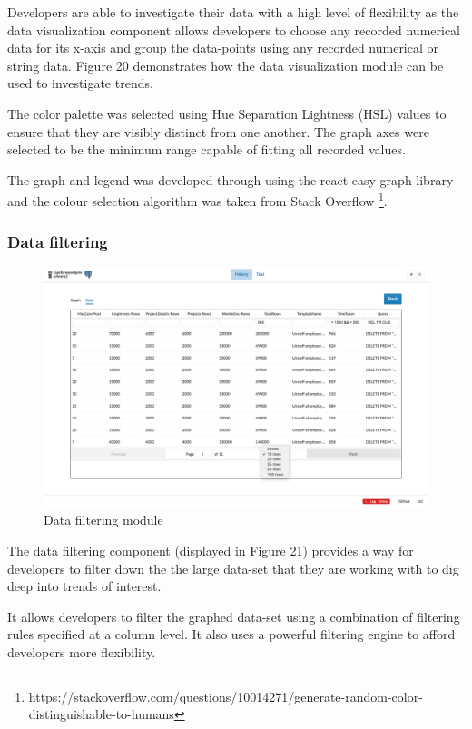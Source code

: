\documentclass[12pt]{article}
\begin{document}
\begin{spacing}{1.9}
	Developers are able to investigate their data with a high level of flexibility as the data visualization component allows developers to choose any recorded numerical data for its x-axis and group the data-points using any recorded numerical or string data. Figure 20 demonstrates how the data visualization module can be used to investigate trends.
	
	The color palette was selected using Hue Separation Lightness (HSL) values to ensure that they are visibly distinct from one another. The graph axes were selected to be the minimum range capable of fitting all recorded values.
	
	The graph and legend was developed through using the react-easy-graph library and the colour selection algorithm was taken from Stack Overflow \footnote{https://stackoverflow.com/questions/10014271/generate-random-color-distinguishable-to-humans}.
	
	\subsubsection{ Data filtering}
	
	\begin{figure}[H]
		\centering
		\includegraphics[width=\textwidth]{3-6-3.png}
		\caption{Data filtering module }
		
	\end{figure}
	
	The data filtering component (displayed in Figure 21) provides a way for developers to filter down the the large data-set that they are working with to dig deep into trends of interest.
	
	It allows developers to filter the graphed data-set using a combination of filtering rules specified at a column level. It also uses a powerful filtering engine to afford developers more flexibility.
	

\end{spacing}
\end{document}
